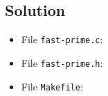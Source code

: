 
\subsection*{Solution}

\lstset{language=c,tabsize=4}
\begin{itemize}
\item[] File \texttt{fast-prime.c}:

\item[] File \texttt{fast-prime.h}:

\lstset{language=[gnu]make,tabsize=4}
\item[] File \texttt{Makefile}:

\end{itemize}
